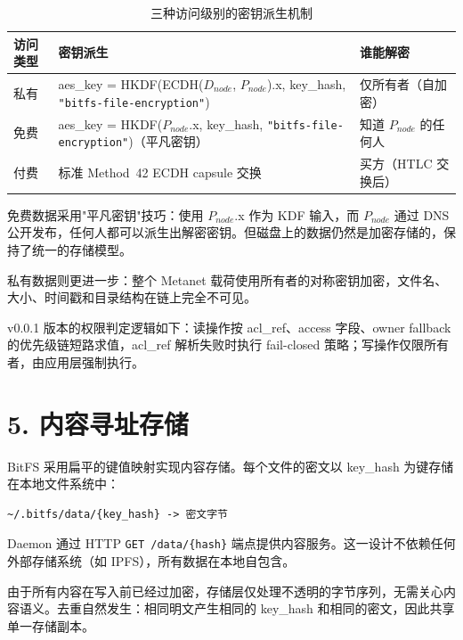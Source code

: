 \documentclass[11pt,a4paper]{article}
\begin{document}
\begin{table}[htbp]
\centering
\small
\begin{tabularx}{\textwidth}{@{}l >{\raggedright\arraybackslash}X >{\raggedright\arraybackslash}X@{}}
\toprule
\textbf{访问类型} & \textbf{密钥派生} & \textbf{谁能解密} \\
\midrule
私有 & aes\_key = HKDF(ECDH($D_{node}$, $P_{node}$).x, key\_hash, \texttt{"bitfs-file-encryption"}) & 仅所有者（自加密） \\
\addlinespace
免费 & aes\_key = HKDF($P_{node}$.x, key\_hash, \texttt{"bitfs-file-encryption"})（平凡密钥） & 知道 $P_{node}$ 的任何人 \\
\addlinespace
付费 & 标准 Method~42 ECDH capsule 交换 & 买方（HTLC 交换后） \\
\bottomrule
\end{tabularx}
\caption{三种访问级别的密钥派生机制}
\label{tab:access-levels}
\end{table}

免费数据采用"平凡密钥"技巧：使用 $P_{node}$.x 作为 KDF 输入，而 $P_{node}$ 通过 DNS 公开发布，任何人都可以派生出解密密钥。但磁盘上的数据仍然是加密存储的，保持了统一的存储模型。

私有数据则更进一步：整个 Metanet 载荷使用所有者的对称密钥加密，文件名、大小、时间戳和目录结构在链上完全不可见。

v0.0.1 版本的权限判定逻辑如下：读操作按 acl\_ref、access 字段、owner fallback 的优先级链短路求值，acl\_ref 解析失败时执行 fail-closed 策略；写操作仅限所有者，由应用层强制执行。

\section{5. 内容寻址存储}

BitFS 采用扁平的键值映射实现内容存储。每个文件的密文以 key\_hash 为键存储在本地文件系统中：

\begin{lstlisting}
~/.bitfs/data/{key_hash} -> 密文字节
\end{lstlisting}

Daemon 通过 HTTP \texttt{GET /data/\{hash\}} 端点提供内容服务。这一设计不依赖任何外部存储系统（如 IPFS），所有数据在本地自包含。

由于所有内容在写入前已经过加密，存储层仅处理不透明的字节序列，无需关心内容语义。去重自然发生：相同明文产生相同的 key\_hash 和相同的密文，因此共享单一存储副本。
\end{document}

